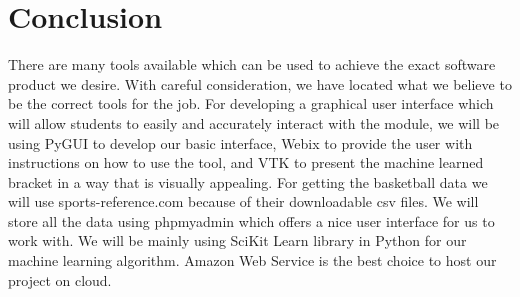 \documentclass[journal,onecolumn]{IEEEtran}
\begin{document}




\section{Conclusion}
There are many tools available which can be used to achieve the exact software product we desire. With careful consideration, we have located what we believe to be the correct tools for the job. For developing a graphical user interface which will allow students to easily and accurately interact with the module, we will be using PyGUI to develop our basic interface, Webix to provide the user with instructions on how to use the tool, and VTK to present the machine learned bracket in a way that is visually appealing. For getting the basketball data we will use sports-reference.com because of their downloadable csv files. We will store all the data using phpmyadmin which offers a nice user interface for us to work with. We will be mainly using SciKit Learn library in Python for our machine learning algorithm. Amazon Web Service is the best choice to host our project on cloud. 






%
\end{document}
